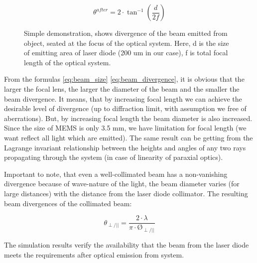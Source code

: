 \begin{figure}[H]
\begin{minipage}[h]{0.52\linewidth}
\end{minipage}
\hfill
\begin{minipage}[h]{0.45\linewidth}
\begin{equation}\label{eq:beam_divergence}
\theta^{after} = 2 \cdot \tan^{-1}{(\frac{d}{2f})}
\end{equation}
\end{minipage}
\caption{
Simple demonstration, shows divergence of the beam emitted from object, seated at the focus of the optical system. Here, d is the size of emitting area of laser diode (200 um in our case), f is total focal length of the optical system.
}
\label{fig:lens}
\end{figure}





From the formulas \ref{eq:beam_size} \ref{eq:beam_divergence}, it is obvious that the larger the focal lens, the larger the diameter of the beam and the smaller the beam divergence. It means, that by increasing focal length we can achieve the desirable level of divergence (up to diffraction limit, with assumption we free of aberrations). But, by increasing focal length the beam diameter is also increased.
Since the size of MEMS is only 3.5 mm, we have limitation for focal length (we want reflect all light which are emitted).
The same result can be getting from the Lagrange invariant relationship between the heights and angles of any two rays propagating through the system (in case of linearity of paraxial optics).

Important to note, that even a well-collimated beam has a non-vanishing divergence because of wave-nature of the light, the beam diameter varies (for large distances) with the distance from the laser diode collimator. The resulting beam divergences of the collimated beam:


\begin{equation}\label{eq:beam_divergence}
\theta_{\perp/||} = \frac{2\cdot \lambda}{\pi \cdot \text{\O}_{\perp/||}}
\end{equation}





The simulation results verify the availability that the beam from the
laser diode meets the requirements after optical emission from system.



